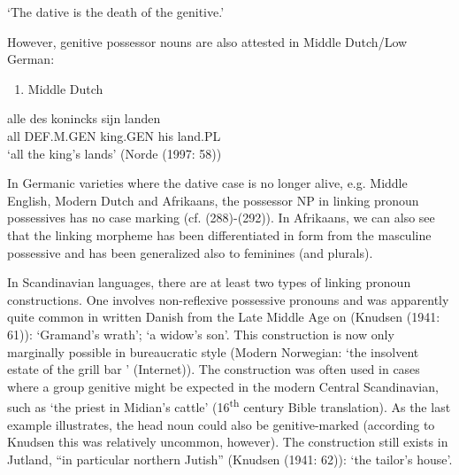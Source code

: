 ‘The dative is the death of the genitive.’
\z


 However, genitive possessor nouns are also attested in Middle Dutch/Low German:

\begin{enumerate} %
\item 
Middle Dutch

\end{enumerate} %
\ea\label{}
\gll alle  des  konincks  sijn  landen\\


all  DEF.M.GEN  king.GEN  his  land.PL\\ %


‘all the king’s lands’ (Norde (1997: 58))
\z

In Germanic varieties where the dative case is no longer alive, e.g. Middle English, Modern Dutch and Afrikaans, the possessor NP in linking pronoun possessives has no case marking (cf. (288){}-(292)). In Afrikaans, we can also see that the linking morpheme  has been differentiated in form from the masculine possessive  and has been generalized also to feminines (and plurals).

In Scandinavian languages, there are at least two types of linking pronoun constructions. One involves non-reflexive possessive pronouns and was apparently quite common in written Danish from the Late Middle Age on (Knudsen (1941: 61)): ‘Gramand’s wrath’;  ‘a widow’s son’. This construction is now only marginally possible in bureaucratic style (Modern Norwegian:  ‘the insolvent estate of the grill bar ’ (Internet)). The construction was often used in cases where a group genitive might be expected in the modern Central Scandinavian, such as  ‘the priest in Midian’s cattle’ (16\textsuperscript{th} century Bible translation). As the last example illustrates, the head noun could also be genitive-marked (according to Knudsen this was relatively uncommon, however). The construction still exists in Jutland, “in particular northern Jutish” (Knudsen (1941: 62)):  ‘the tailor’s house’.

